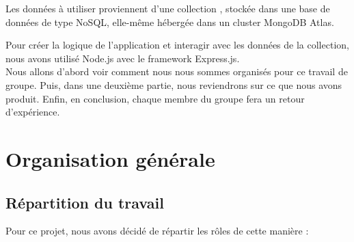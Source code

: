 \documentclass[12pt,a4paper]{article}
\begin{document}
Les données à utiliser proviennent d'une collection , stockée dans une base de données de type NoSQL, elle-même hébergée dans un cluster MongoDB Atlas. 


Pour créer la logique de l'application et interagir avec les données de la collection, nous avons utilisé Node.js avec le framework Express.js. \\

Nous allons d'abord voir comment nous nous sommes organisés pour ce travail de groupe. Puis, dans une deuxième partie, nous reviendrons sur ce que nous avons produit. Enfin, en conclusion, chaque membre du groupe fera un retour d'expérience.

\section{Organisation générale}

	\subsection{Répartition du travail}
	
Pour ce projet, nous avons décidé de répartir les rôles de cette manière : \\
\end{document}
